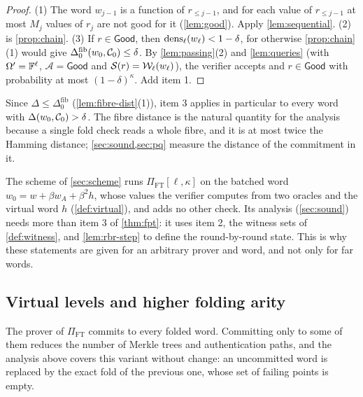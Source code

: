 \begin{proof}
(1) The word $w_{j-1}$ is a function of $r_{\le j-1}$, and for each value of $r_{\le j-1}$ at most $M_j$ values of $r_j$ are not good for it (\cref{lem:good}). Apply \cref{lem:sequential}.
(2) is \cref{prop:chain}.
(3) If $r \in \mathsf{Good}$, then $\mathrm{dens}_\ell(w_\ell) < 1-\delta$, for otherwise \cref{prop:chain}(1) would give $\Delta^{\mathrm{fib}}_0(w_0, \mathcal{C}_0) \le \delta$.
By \cref{lem:passing}(2) and \cref{lem:queries} (with $\Omega' = \mathbb{F}^\ell$, $\mathcal{A} = \mathsf{Good}$ and $\mathcal{S}(r) = \mathcal{W}_\ell(w_\ell)$), the verifier accepts and $r \in \mathsf{Good}$ with probability at most $(1-\delta)^\kappa$. Add item 1.
\end{proof}

\begin{remark}\label{rem:fib-vs-dist}
Since $\Delta \le \Delta^{\mathrm{fib}}_0$ (\cref{lem:fibre-dist}(1)), item 3 applies in particular to every word with $\Delta(w_0, \mathcal{C}_0) > \delta$.
The fibre distance is the natural quantity for the analysis because a single fold check reads a whole fibre, and it is at most twice the Hamming distance; \cref{sec:sound,sec:pq} measure the distance of the commitment in it.
\end{remark}

\begin{remark}\label{rem:fpt-use}
The scheme of \cref{sec:scheme} runs $\Pi_{\mathrm{FT}}[\ell,\kappa]$ on the batched word $w_0 = w + \beta w_A + \beta^2 h$, whose values the verifier computes from two oracles and the virtual word $h$ (\cref{def:virtual}), and adds no other check.
Its analysis (\cref{sec:sound}) needs more than item 3 of \cref{thm:fpt}: it uses item 2, the witness sets of \cref{def:witness}, and \cref{lem:rbr-step} to define the round-by-round state.
This is why these statements are given for an arbitrary prover and word, and not only for far words.
\end{remark}

\subsection{Virtual levels and higher folding arity}\label{sec:fold:arity}

The prover of $\Pi_{\mathrm{FT}}$ commits to every folded word. Committing only to some of them reduces the number of Merkle trees and authentication paths, and the analysis above covers this variant without change: an uncommitted word is replaced by the exact fold of the previous one, whose set of failing points is empty.

